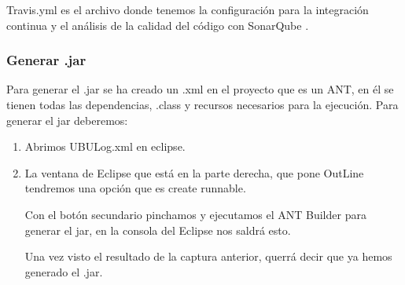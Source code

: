Travis.yml es el archivo donde tenemos la configuración para la integración continua y el análisis de la calidad del código con SonarQube \cite{web:travis,web:sonarqube}.

\subsubsection{Generar .jar}\label{generar-jar}

Para generar el .jar se ha creado un .xml en el proyecto que es un ANT, en él se tienen todas las dependencias, .class y recursos necesarios para la ejecución. Para generar el jar deberemos:

\begin{enumerate}
	\tightlist
	\item
	Abrimos UBULog.xml en eclipse.
	\item
	La ventana de Eclipse que está en la parte derecha, que pone OutLine tendremos una opción que es create runnable.
	
	
	Con el botón secundario pinchamos y ejecutamos el ANT Builder para generar el jar, en la consola del Eclipse nos saldrá esto.
	
	
	Una vez visto el resultado de la captura anterior, querrá decir que ya hemos generado el .jar.
	
\end{enumerate}

